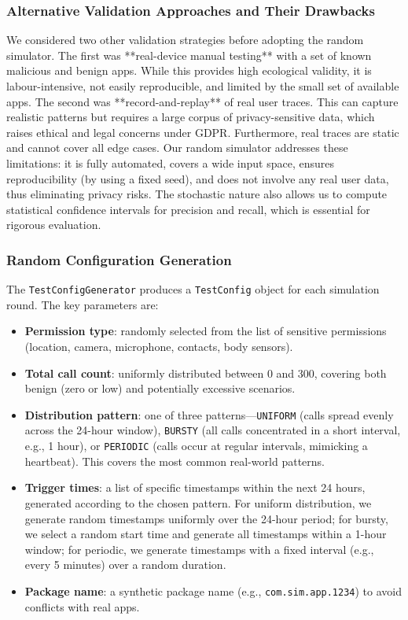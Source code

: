 \subsubsection{Alternative Validation Approaches and Their Drawbacks}

We considered two other validation strategies before adopting the random simulator. The first was **real-device manual testing** with a set of known malicious and benign apps. While this provides high ecological validity, it is labour-intensive, not easily reproducible, and limited by the small set of available apps. The second was **record-and-replay** of real user traces. This can capture realistic patterns but requires a large corpus of privacy-sensitive data, which raises ethical and legal concerns under GDPR. Furthermore, real traces are static and cannot cover all edge cases. Our random simulator addresses these limitations: it is fully automated, covers a wide input space, ensures reproducibility (by using a fixed seed), and does not involve any real user data, thus eliminating privacy risks. The stochastic nature also allows us to compute statistical confidence intervals for precision and recall, which is essential for rigorous evaluation.

\subsubsection{Random Configuration Generation}

The \texttt{TestConfigGenerator} produces a \texttt{TestConfig} object for each simulation round. The key parameters are:
\begin{itemize}
\item \textbf{Permission type}: randomly selected from the list of sensitive permissions (location, camera, microphone, contacts, body sensors).
\item \textbf{Total call count}: uniformly distributed between 0 and 300, covering both benign (zero or low) and potentially excessive scenarios.
\item \textbf{Distribution pattern}: one of three patterns—\texttt{UNIFORM} (calls spread evenly across the 24-hour window), \texttt{BURSTY} (all calls concentrated in a short interval, e.g., 1 hour), or \texttt{PERIODIC} (calls occur at regular intervals, mimicking a heartbeat). This covers the most common real-world patterns.
\item \textbf{Trigger times}: a list of specific timestamps within the next 24 hours, generated according to the chosen pattern. For uniform distribution, we generate random timestamps uniformly over the 24-hour period; for bursty, we select a random start time and generate all timestamps within a 1-hour window; for periodic, we generate timestamps with a fixed interval (e.g., every 5 minutes) over a random duration.
\item \textbf{Package name}: a synthetic package name (e.g., \texttt{com.sim.app.1234}) to avoid conflicts with real apps.
\end{itemize}

